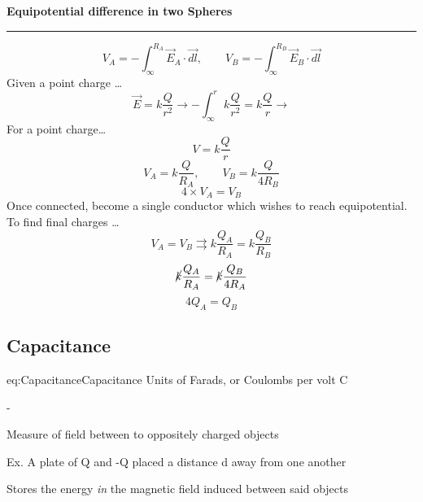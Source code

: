 \pagebreak
\begin{example}
  \begin{center}

    \textbf{Equipotential difference in two Spheres} 
    \vspace{.1cm}
    \hrule
    \vspace{.25cm}
      \[
      V_A = - \int_{\infty}^{R_A} \vec{E}_A \cdot \vec{dl},
      \qquad 
      V_B = - \int_{\infty}^{R_B} \vec{E}_B \cdot \vec{dl}
      \]
      Given a point charge \dots
      \[
      \vec{E} = k\frac{Q}{r^2} 
      \rightarrow 
      -\int_{\infty}^{r} k \frac{Q}{r^2} = k \frac{Q}{r}
      \rightarrow 
      \]
      For a point charge\dots
      \[V = k \frac{Q}{r}\]
      \[
      V_A = k \frac{Q}{R_A},
      \qquad
      V_B = k \frac{Q}{4 R_B}
      \]
      \[
      4 \times V_A = V_B 
      \]
      Once connected, become a single conductor which wishes to reach equipotential. To find final charges \dots
      \[
      V_A = V_B 
      \rightrightarrows
      k \frac{Q_A}{R_A} = k \frac{Q_B}{R_B}
      \] 
      \[
      \cancel{k} \frac{Q_A}{R_A} = \cancel{k} \frac{Q_B}{4 R_A}
      \]
      \[
      4Q_A = Q_B
      \]


  \end{center}
\end{example}

\pagebreak
\subsection{Capacitance}
\begin{eqboxed}{eq:Capacitance}{Capacitance}
{Units of Farads, or Coulombs per volt}
C \equiv {}
\end{eqboxed}
\begin{list}{-}{}
\item Measure of field between to oppositely charged objects
\item Ex. A plate of Q and -Q placed a distance d away from one another 
\item Stores the energy \textit{in} the magnetic field induced between said objects
\end{list}

